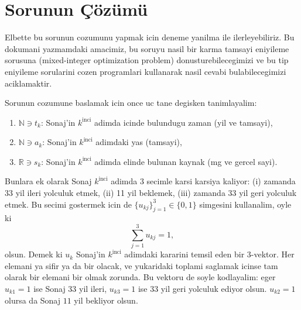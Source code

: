 \section{Sorunun \c{C}\"{o}z\"{u}m\"{u}}
\label{sec:solution}

Elbette bu sorunun cozumunu yapmak icin deneme yanilma ile ilerleyebiliriz. Bu
dokumani yazmamdaki amacimiz, bu soruyu nasil bir karma tamsayi eniyileme
sorusuna (mixed-integer optimization problem) donusturebilecegimizi ve bu tip
eniyileme sorularini cozen programlari kullanarak nasil cevabi bulabilecegimizi
aciklamaktir.

Sorunun cozumune baslamak icin once uc tane degisken tanimlayalim: 
\begin{enumerate}
    \item $\mathbb{N} \ni t_k $: Sonaj'in $k^{\text{inci}}$ adimda icinde bulundugu zaman (yil ve tamsayi),
    \item $\mathbb{N} \ni a_k$: Sonaj'in $k^{\text{inci}}$ adimdaki yas (tamsayi),
    \item $\mathbb{R} \ni s_k$: Sonaj'in $k^{\text{inci}}$ adimda elinde bulunan kaynak (mg ve gercel sayi).
\end{enumerate}
%
Bunlara ek olarak Sonaj $k^{\text{inci}}$ adimda $3$ secimle karsi karsiya
kaliyor: (i) zamanda 33 yil ileri yolculuk etmek, (ii) 11 yil beklemek, (iii)
zamanda 33 yil geri yolculuk etmek. Bu secimi gostermek icin de
$\{u_{kj}\}_{j=1}^3 \in \{0, 1\}$ simgesini kullanalim, oyle ki
%
\begin{equation}
    \sum_{j=1}^3 u_{kj} = 1,
    \label{eq:constraints_u}
\end{equation}
%
olsun. Demek ki $u_k$ Sonaj'in $k^{\text{inci}}$ adimdaki kararini temsil eden
bir $3$-vektor. Her elemani ya sifir ya da bir olacak, ve yukaridaki toplami
saglamak icinse tam olarak bir elemani bir olmak zorunda. Bu vektoru de soyle
kodlayalim: eger $u_{k1} = 1$ ise Sonaj $33$ yil ileri, $u_{k3} = 1$ ise $33$
yil geri yolculuk ediyor olsun. $u_{k2} = 1$ olursa da Sonaj $11$ yil bekliyor
olsun.

